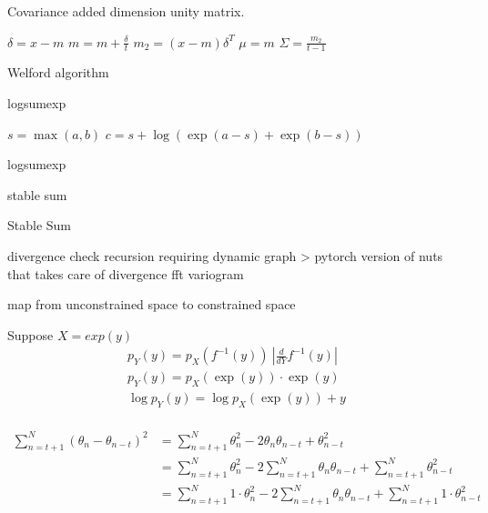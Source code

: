 \documentclass[]{report}
\begin{document}
Covariance added dimension unity matrix.

\begin{algorithm}
\DontPrintSemicolon
{}

$\delta = x-m$ \;
$m = m + \frac{\delta}{t} $\;
$m_2 = (x-m)\delta^T $ \;
$\mu = m $\;
$\Sigma = \frac{m_2}{t-1} $\;
\caption{Welford algorithm}
\end{algorithm}

logsumexp
\begin{algorithm}
\DontPrintSemicolon
{}
$s = \max(a,b) $\;
$c = s + \log( \exp(a-s) + \exp(b-s)) $\;

\caption{logsumexp}
\end{algorithm}


stable sum 
\begin{algorithm}
\DontPrintSemicolon
{}



\caption{Stable Sum }
\end{algorithm}

divergence check 
recursion requiring dynamic graph  > pytorch
version of nuts that takes care of divergence
fft variogram

map from unconstrained space to constrained space

Suppose $ X = exp(y) $  
\begin{align*}
p_Y(y) = p_X(f^{-1}(y)) \ |\frac{d}{dY} f^{-1}(y) |\\
p_Y(y) = p_X(\exp(y)) \cdot \exp(y) \\
\log p_Y(y) = \log p_X(\exp(y)) + y \\
\end{align*}

\begin{align*}
 \sum_{n=t+1}^N (\theta_{n} - \theta_{n-t})^2 &= \sum_{n=t+1}^N \theta_n^2 - 2 \theta_n \theta_{n-t} + \theta_{n-t}^2  \\
 &= \sum_{n=t+1}^N \theta_n^2 -2 \sum_{n=t+1}^N \theta_n \theta_{n-t} + \sum_{n=t+1}^N \theta_{n-t}^2 \\ 
  &= \sum_{n=t+1}^N 1 \cdot \theta_n^2 -2 \sum_{n=t+1}^N \theta_n \theta_{n-t} + \sum_{n=t+1}^N 1 \cdot \theta_{n-t}^2 \\
\end{align*}
\end{document}
